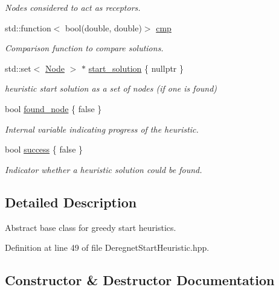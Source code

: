 \begin{DoxyCompactItemize}
\begin{DoxyCompactList}\small\item\em Nodes considered to act as \textquotesingle{}receptors\textquotesingle{}. \end{DoxyCompactList}\item 
std\+::function$<$ bool(double, double)$>$ \hyperlink{classderegnet_1_1DeregnetStartHeuristic_aa5af4d29e3b276c0046c997c16cca3a1}{cmp}
\begin{DoxyCompactList}\small\item\em Comparison function to compare solutions. \end{DoxyCompactList}\item 
std\+::set$<$ \hyperlink{namespacederegnet_a744bad34f2de9856d36715a445f027f3}{Node} $>$ $\ast$ \hyperlink{classderegnet_1_1DeregnetStartHeuristic_a7450e11ca0a265b055f95e7832b65e2f}{start\+\_\+solution} \{ nullptr \}
\begin{DoxyCompactList}\small\item\em heuristic start solution as a set of nodes (if one is found) \end{DoxyCompactList}\item 
bool \hyperlink{classderegnet_1_1DeregnetStartHeuristic_a1ca705794583fb3b6e563efeceb4445e}{found\+\_\+node} \{ false \}
\begin{DoxyCompactList}\small\item\em Internal variable indicating progress of the heuristic. \end{DoxyCompactList}\item 
bool \hyperlink{classderegnet_1_1DeregnetStartHeuristic_a72fd16ee027f6aa973f1ff29746addba}{success} \{ false \}
\begin{DoxyCompactList}\small\item\em Indicator whether a heuristic solution could be found. \end{DoxyCompactList}\end{DoxyCompactItemize}


\subsection{Detailed Description}
Abstract base class for greedy start heuristics. 

Definition at line 49 of file Deregnet\+Start\+Heuristic.\+hpp.



\subsection{Constructor \& Destructor Documentation}
\mbox{\label{classderegnet_1_1DeregnetStartHeuristic_af7fa694b10f54c669fce9431214ffc98}} 
